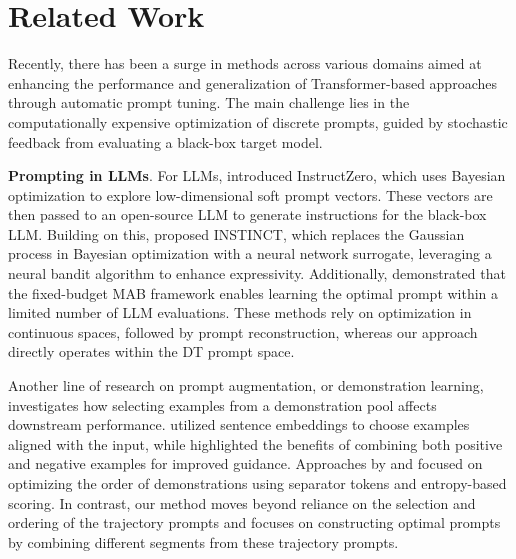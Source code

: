 \section{Related Work}
\label{sec:related_work}
Recently, there has been a surge in methods across various domains aimed at enhancing the performance and generalization of Transformer-based approaches through automatic prompt tuning. The main challenge lies in the computationally expensive optimization of discrete prompts, guided by stochastic feedback from evaluating a black-box target model.

\textbf{Prompting in LLMs}. For LLMs, \citet{pmlr-v235-chen24e} introduced {I}nstruct{Z}ero, which uses Bayesian optimization to explore low-dimensional soft prompt vectors. These vectors are then passed to an open-source LLM to generate instructions for the black-box LLM. Building on this, \citet{lin2023use} proposed INSTINCT, which replaces the Gaussian process in Bayesian optimization with a neural network surrogate, leveraging a neural bandit algorithm to enhance expressivity. Additionally, \citet{shi2024best} demonstrated that the fixed-budget MAB framework enables learning the optimal prompt within a limited number of LLM evaluations. These methods rely on optimization in continuous spaces, followed by prompt reconstruction, whereas our approach directly operates within the DT prompt space.

Another line of research on prompt augmentation, or demonstration learning, investigates how selecting examples from a demonstration pool affects downstream performance. \citet{liu2021makes} utilized sentence embeddings to choose examples aligned with the input, while \citet{mishra2021natural} highlighted the benefits of combining both positive and negative examples for improved guidance. Approaches by \citet{kumar2021reordering} and \citet{lu2021fantastically} focused on optimizing the order of demonstrations using separator tokens and entropy-based scoring. In contrast, our method moves beyond reliance on the selection and ordering of the trajectory prompts and focuses on constructing optimal prompts by combining different segments from these trajectory prompts.

